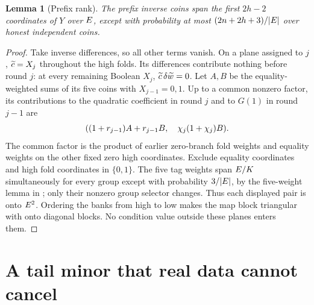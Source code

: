 \documentclass[11pt]{article}
\newtheorem{lemma}{Lemma}
\begin{document}
\begin{lemma}[Prefix rank]\label{lem:jump-prefix}
The prefix inverse coins span the first $2h-2$ coordinates of $Y$ over $E$, except with probability at most $(2n+2h+3)/|E|$ over honest independent coins.
\end{lemma}
\begin{proof}
Take inverse differences, so all other terms vanish. On a plane assigned to $j$, $\widetilde{c}=X_j$ throughout the high folds. Its differences contribute nothing before round $j$: at every remaining Boolean $X_j$, $\widetilde{c}\,\delta\widetilde{w}=0$. Let $A,B$ be the equality-weighted sums of its five coins with $X_{j-1}=0,1$. Up to a common nonzero factor, its contributions to the quadratic coefficient in round $j$ and to $G(1)$ in round $j-1$ are
\[
 ((1+r_{j-1})A+r_{j-1}B,\quad \chi_j(1+\chi_j)B).
\]
The common factor is the product of earlier zero-branch fold weights and equality weights on the other fixed zero high coordinates. Exclude equality coordinates and high fold coordinates in $\{0,1\}$. The five tag weights span $E/K$ simultaneously for every group except with probability $3/|E|$, by the five-weight lemma in ; only their nonzero group selector changes. Thus each displayed pair is onto $E^2$. Ordering the banks from high to low makes the map block triangular with onto diagonal blocks. No condition value outside these planes enters them.
\end{proof}

\section{A tail minor that real data cannot cancel}
\end{document}
